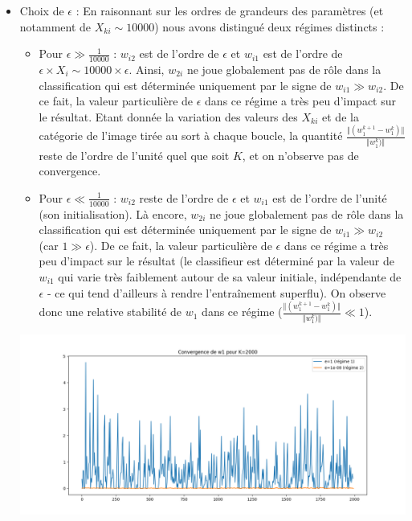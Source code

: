 \documentclass[a4paper,11pt]{article}
\begin{document}
\begin{itemize}
	\item Choix de $\epsilon$ : En raisonnant sur les ordres de grandeurs des paramètres (et notamment de $X_{ki} \sim 10000$) nous avons distingué deux régimes distincts :\\
	
	\begin{itemize}
		\item Pour $\epsilon \gg \frac{1}{10000}$ : $w_{i2}$ est de l'ordre de $\epsilon$ et $w_{i1}$ est de l'ordre de $\epsilon \times X_i \sim 10000 \times \epsilon$. Ainsi, $w_{2i}$ ne joue globalement pas de rôle dans la classification qui est déterminée uniquement par le signe de $w_{i1} \gg w_{i2}$. De ce fait, la valeur particulière de $\epsilon$ dans ce régime a très peu d'impact sur le résultat. Etant donnée la variation des valeurs des $X_{ki}$ et de la catégorie de l'image tirée au sort à chaque boucle, la quantité $  \frac{\Vert(w_1^{k+1} - w_1^{k})\Vert}{\Vert w_1^{k})\Vert}$ reste de l'ordre de l'unité quel que soit $K$, et on n'observe pas de convergence.\\
		
		\item Pour $\epsilon \ll \frac{1}{10000}$ : $w_{i2}$ reste de l'ordre de $\epsilon$ et $w_{i1}$ est de l'ordre de l'unité (son initialisation). Là encore, $w_{2i}$ ne joue globalement pas de rôle dans la classification qui est déterminée uniquement par le signe de $w_{i1} \gg w_{i2}$ (car $1 \gg \epsilon$). De ce fait, la valeur particulière de $\epsilon$ dans ce régime a très peu d'impact sur le résultat (le classifieur est déterminé par la valeur de $w_{i1}$ qui varie très faiblement autour de sa valeur initiale, indépendante de $\epsilon$ - ce qui tend d'ailleurs à rendre l'entraînement superflu). On observe donc une relative stabilité de $w_1$ dans ce régime ($  \frac{\Vert(w_1^{k+1} - w_1^{k})\Vert}{\Vert w_1^{k})\Vert} \ll 1$). \\
	\end{itemize}
\includegraphics[width=15cm]{"Fig4 Cv w1 2 regimes"}\\


\end{itemize}
\end{document}
